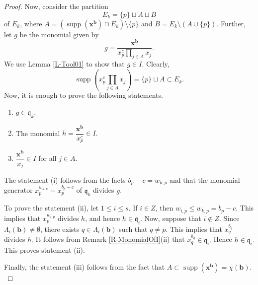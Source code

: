 \documentclass[12pt,reqno]{amsart}
\theoremstyle{definition}
\newcommand{\q}{\mathfrak{q}}
\newcommand{\x}{\mathbf{x}}
\newcommand{\bb}{\mathbf{b}}
\newcommand{\C}{\chi}
\newcommand{\Lm}{\Lambda}
\newcommand{\supp}[1]{\operatorname{supp}\left(#1\right)}
\numberwithin{equation}{section}
\begin{document}
\begin{proof}
    Now, consider the partition 
    \[E_k = \{p\} \sqcup A \sqcup B\]
    of $E_k$, where $A = (\supp{\x^{\bb}} \cap E_k) \setminus \{p\}$ and $B = E_k \setminus (A \cup \{p\}).$ Further, let $g$ be the monomial given by
    \[g = \dfrac{\x^\bb}{x_p^{c} \prod\limits_{j \in A} x_j}.\]
    We use Lemma \ref{L-Tool01} to show that $g \in I.$ Clearly, 
    \[\supp{x_p^{c} \prod\limits_{j \in A} x_j} = \{p\} \sqcup A \subset E_k.\] 
    Now, it is enough to prove the following statements.
    \begin{enumerate}[\rm(i)]
        \item $g \in \q_k.$
        
        \item The monomial $h = \dfrac{\x^{\bb}}{x_p^{c}} \in I.$ 

        \item $\dfrac{\x^{\bb}}{x_j} \in I$ for all $j \in A.$ 
    \end{enumerate}
    
    The statement (i) follows from the facts $b_p - c = w_{k, p}$ and that the monomial generator  $x_p^{w_{k, p}} = x_p^{b_p - c}$ of $\q_k$ divides $g.$ 
    
    To prove the statement (ii), let $1 \le i \le s.$ If $i \in Z$, then $w_{i, p} \le w_{k, p} = b_p - c.$ This implies that $x_p^{w_{i, p}}$ divides $h$, and hence $h \in \q_i.$ Now, suppose that $i \notin Z.$ Since $\Lm_i(\bb) \ne \emptyset$, there exists $q \in \Lm_i(\bb)$ such that $q \ne p.$ This implies that $x_q^{b_q}$ divides $h.$ It follows from Remark \ref{R-MonomialOfI}(ii) that $x_q^{b_q} \in \q_i.$ Hence $h \in \q_i.$ This proves statement (ii).
    
    Finally, the statement (iii) follows from the fact that $A \subset \supp{\x^{\bb}} = \C(\bb).$
    

\end{proof}
\end{document}
